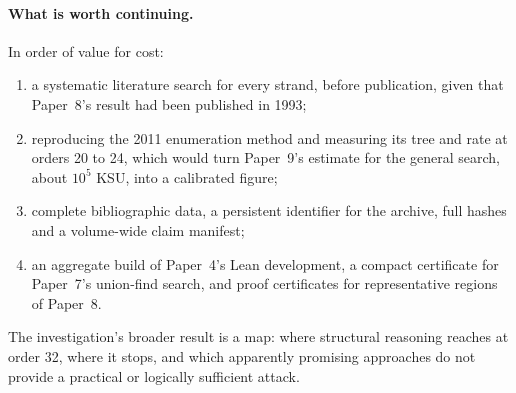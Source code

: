 \documentclass[11pt,a4paper,oneside]{report}
\theoremstyle{definition}
\begin{document}
\paragraph{What is worth continuing.} In order of value for cost:
\begin{enumerate}[nosep]
\item a systematic literature search for every strand, before publication, given that Paper~8's
result had been published in 1993;
\item reproducing the 2011 enumeration method and measuring its tree and rate at orders 20 to 24, which
would turn Paper~9's estimate for the general search, about $10^5$ KSU, into a calibrated figure;
\item complete bibliographic data, a persistent identifier for the archive, full hashes and a
volume-wide claim manifest;
\item an aggregate build of Paper~4's Lean development, a compact certificate for Paper~7's
union-find search, and proof certificates for representative regions of Paper~8.
\end{enumerate}
The investigation's broader result is a map: where structural reasoning reaches at order 32, where
it stops, and which apparently promising approaches do not provide a practical or logically
sufficient attack.
\end{document}
